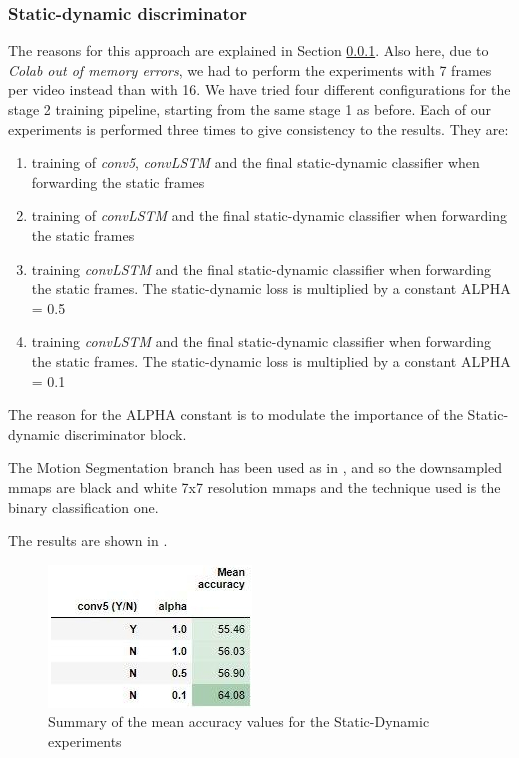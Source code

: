 \documentclass[10pt,twocolumn,hidelinks,letterpaper]{article}
\begin{document}
\subsubsection{Static-dynamic discriminator}
\label{ds_section}
The reasons for this approach are explained in Section \ref{ds_section}. Also here, due to \textit{Colab out of memory errors}, we had to perform the experiments with 7 frames per video instead than with 16. We have tried four different configurations for the stage 2 training pipeline, starting from the same stage 1 as before. Each of our experiments is performed three times to give consistency to the results. They are:
\begin{enumerate}
  \item training of \textit{conv5}, \textit{convLSTM} and the final static-dynamic classifier when forwarding the static frames
  \item training of \textit{convLSTM} and the final static-dynamic classifier when forwarding the static frames
  \item training \textit{convLSTM} and the final static-dynamic classifier when forwarding the static frames. The static-dynamic loss is multiplied by a constant ALPHA = 0.5
  \item training \textit{convLSTM} and the final static-dynamic classifier when forwarding the static frames. The static-dynamic loss is multiplied by a constant ALPHA = 0.1
\end{enumerate}

The reason for the ALPHA constant is to modulate the importance of the Static-dynamic discriminator block.

The Motion Segmentation branch has been used as in \cite{sparnet}, and so the downsampled mmaps are black and white 7x7 resolution mmaps and the technique used is the binary classification one.

The results are shown in .

\begin{figure}[t]
  \centering
  \includegraphics[width=.6\linewidth]{images/step3.2_table.jpg}
  \caption{Summary of the mean accuracy values for the Static-Dynamic experiments}
  \label{DS_table}
\end{figure}
\end{document}
